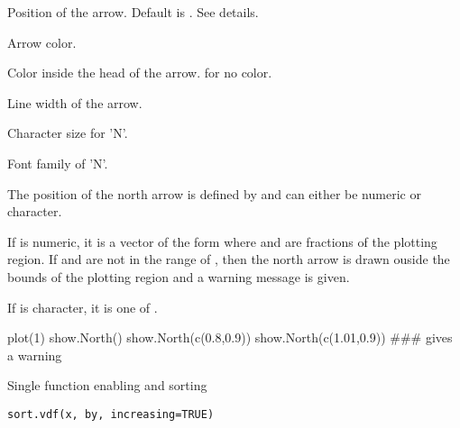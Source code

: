 \documentclass[a4paper]{book}
\begin{document}
\begin{Arguments}
\begin{ldescription}
\item[\code{pos}] Position of the arrow. Default is . See details.

\item[\code{arrow.col}] Arrow color.

\item[\code{arrow.fill}] Color inside the head of the arrow.  for no color.

\item[\code{arrow.lwd}] Line width of the arrow.

\item[\code{N.cex}] Character size for 'N'.

\item[\code{N.family}] Font family of 'N'.


\end{ldescription}
\end{Arguments}
%
\begin{Details}\relax
The position of the north arrow is defined by  and can either be numeric or character.

If  is numeric, it is a vector of the form  where  and  are fractions of the plotting region.
If  and  are not in the range of , then the north arrow is drawn ouside the bounds of the plotting region 
and a warning message is given.

If  is character, it is one of .

\end{Details}
%
\begin{Examples}
\begin{ExampleCode}
plot(1)
show.North()
show.North(c(0.8,0.9))
show.North(c(1.01,0.9))  ### gives a warning
\end{ExampleCode}
\end{Examples}
\newpage
{}
%
\begin{Description}\relax
Single function enabling  and  sorting
\end{Description}
%
\begin{Usage}
\begin{verbatim}
sort.vdf(x, by, increasing=TRUE)
\end{verbatim}
\end{Usage}
\end{document}
